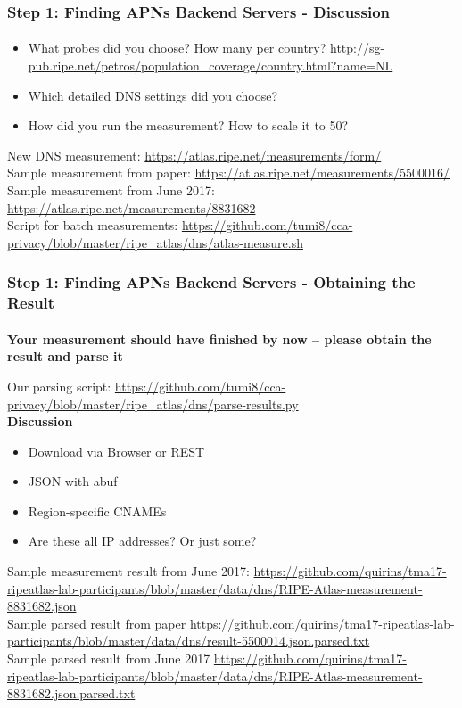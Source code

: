 \begin{frame}
\frametitle{Step 1: Finding APNs Backend Servers - Discussion}
\framesubtitle{}
\begin{itemize}
	\item What probes did you choose? How many per country? \hyperlink{NL example}{\url{http://sg-pub.ripe.net/petros/population_coverage/country.html?name=NL}}
	\item Which detailed DNS settings did you choose?
	\item How did you run the measurement? How to scale it to 50?
\end{itemize}
New DNS measurement: \url{https://atlas.ripe.net/measurements/form/} \\
Sample measurement from paper: \url{https://atlas.ripe.net/measurements/5500016/} \\
Sample measurement from June 2017: \url{https://atlas.ripe.net/measurements/8831682} \\
Script for batch measurements: \url{https://github.com/tumi8/cca-privacy/blob/master/ripe\_atlas/dns/atlas-measure.sh} \\

\end{frame}
\clearpage
\begin{frame}
\frametitle{Step 1: Finding APNs Backend Servers - Obtaining the Result}
\framesubtitle{}
\textbf{Your measurement should have finished by now -- please obtain the result and parse it} 

Our parsing script: \url{https://github.com/tumi8/cca-privacy/blob/master/ripe\_atlas/dns/parse-results.py}\\

\pause
 \textbf{Discussion}
 \vspace{-5mm}
\begin{itemize}
	\item Download via Browser or REST
	\item JSON with abuf
	\item Region-specific CNAMEs
	\item Are these all IP addresses? Or just some?
\end{itemize}
\small{
Sample measurement result from June 2017: \url{https://github.com/quirins/tma17-ripeatlas-lab-participants/blob/master/data/dns/RIPE-Atlas-measurement-8831682.json}\\
Sample parsed result from paper \url{https://github.com/quirins/tma17-ripeatlas-lab-participants/blob/master/data/dns/result-5500014.json.parsed.txt} \\
Sample parsed result from June 2017 \url{https://github.com/quirins/tma17-ripeatlas-lab-participants/blob/master/data/dns/RIPE-Atlas-measurement-8831682.json.parsed.txt}\\
}

\end{frame}
\clearpage

